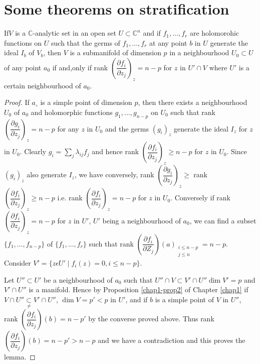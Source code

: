 \chapter{Some theorems on  stratification}\label{chap2}


\setcounter{lemma}{0}
\begin{lemma}\label{chap2-lem1}
  If\pageoriginale $V$ is a  $ \mathbb{C}$-analytic set in an open set $U
  \subset   \mathbb{C}^n$ and  if $f_1,\ldots, f_r$ are holomorohic
  functions  on $U$ such that the germs of $f_1,\ldots , f_r$ at any
  point $b$ in $U$  generate  the ideal $I_b$ of $V_b$, then $V$ is a
  submanifold  of dimension $p$  in  a neighbourhood  $U_0 \subset
  U$ of any point $a_0$ if and,only if rank $\left(\dfrac{\partial
    f_i}{\partial z_{j}}\right)_{z} = n-p $ for $z$ in $U' \cap V $ where
  $U'$ is a certain neighbourhood of $a_0$. 
\end{lemma}

\begin{proof} %
  If  $a_\circ$ is a  simple  point  of  dimension $p$, then there
  exists a neighbourhood $U_0$ of $a_0$ and holomorphic functions
  $g_1,\ldots , g_{n-p}$ on $U_0$ such that rank $\left(\dfrac{\partial
    g_i}{\partial z_j}\right)_{z} = n-p$ for  any $z$ in $U_0$ and the
  germs  $(g_{i})_{z}$ generate  the ideal $I_z$ for $z$ in
  $U_0$. Clearly $g_i = \sum\limits _{j}  \lambda_{ij} f_{j}$ and
  hence rank $\left(\dfrac{\partial f_i}{\partial z_{j}}\right)_{z} \ge n-p$ for
  $z$ in $U_0$. Since $(g_{i})_{z}$ also  generate  $I_z$, we  have
  conversely, rank $\left(\dfrac{\partial g_i}{\partial z_{j}}\right)_{z} \ge$
  rank $\left(\dfrac{\partial f_i}{\partial z_{j}}\right)_{z} \ge n-p$ i.e. rank
  $\left(\dfrac{\partial f_i}{\partial z_{j}}\right)_{z}  =n-p$  for $z$ in
  $U_0$. Conversely if  rank  $\left(\dfrac{\partial f_i}{\partial
    z_{j}}\right)_{z} = n-p$ for $z$  in $U'$, $U'$ being a neighbourhood  of
  $a_0$, we can find  a subset $\{f_1,\ldots ,f_{n-p}\}$  of  $ \{
  f_1,\ldots ,f_r \}$ such that rank $\left(\dfrac{\partial f_i}{\partial
    Z_{j}}\right)(a)_{\substack{i\leq n-p\\j \leq n}}=
  n-p$. Consider $V' = \{z \epsilon U'\mid f_i(z)=0,i\leq n-p \}$.  

 
Let $U'' \subset U'$ be a neighbourhood of $a_0$ such that $U''
\cap V \subset V'\cap  U'' \dim V' = p$ and\pageoriginale $V' \cap U''$ is a
manifold. Hence by Proposition  \ref{chap1-prop2} of Chapter
\ref{chap1}  if $ V \cap U'' 
\underset{\neq}{\subset}  V' \cap U''$, $\dim V=p' < p$  in $U'$, and if
$b$ is a  simple point  of $V$  in $U''$, rank  $\left(\dfrac{\partial
  f_i}{\partial z_j}\right) (b) =n-p'$ by the converse proved above. Thus
rank $\left(\dfrac{\partial f_i}{\partial z_j}\right) (b) =n-p'> n-p$
and we have a contradiction and this proves the lemma. 
\end{proof}

